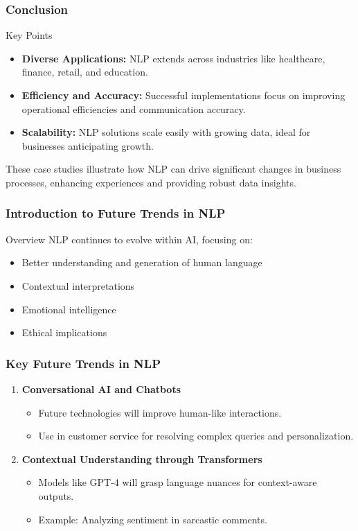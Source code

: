\documentclass[aspectratio=169]{beamer}
\begin{document}
\begin{frame}
    \frametitle{Conclusion}
    \begin{block}{Key Points}
        \begin{itemize}
            \item \textbf{Diverse Applications:} NLP extends across industries like healthcare, finance, retail, and education.
            \item \textbf{Efficiency and Accuracy:} Successful implementations focus on improving operational efficiencies and communication accuracy.
            \item \textbf{Scalability:} NLP solutions scale easily with growing data, ideal for businesses anticipating growth.
        \end{itemize}
    \end{block}
    These case studies illustrate how NLP can drive significant changes in business processes, enhancing experiences and providing robust data insights.
\end{frame}

\begin{frame}[fragile]
    \frametitle{Introduction to Future Trends in NLP}
    \begin{block}{Overview}
        NLP continues to evolve within AI, focusing on:
        \begin{itemize}
            \item Better understanding and generation of human language
            \item Contextual interpretations
            \item Emotional intelligence
            \item Ethical implications
        \end{itemize}
    \end{block}
\end{frame}

\begin{frame}[fragile]
    \frametitle{Key Future Trends in NLP}
    \begin{enumerate}
        \item \textbf{Conversational AI and Chatbots}
            \begin{itemize}
                \item Future technologies will improve human-like interactions.
                \item Use in customer service for resolving complex queries and personalization.
            \end{itemize}
        
        \item \textbf{Contextual Understanding through Transformers}
            \begin{itemize}
                \item Models like GPT-4 will grasp language nuances for context-aware outputs.
                \item Example: Analyzing sentiment in sarcastic comments.
            \end{itemize}
    \end{enumerate}
\end{frame}
\end{document}
